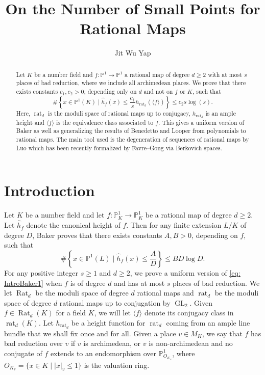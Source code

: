 \documentclass[10pt]{amsart}
\title{On the Number of Small Points for Rational Maps}
\author{Jit Wu Yap}
\newcommand{\bb}{\mathbb}
\newcommand{\h}{\widehat{h}}
\newcommand{\Rat}{\operatorname{Rat}}
\newcommand{\GL}{\operatorname{GL}}
\newcommand{\rat}{\operatorname{rat}}
\numberwithin{theorem}{section}
\numberwithin{example}{section}
\numberwithin{definition}{section}
\begin{document}
\begin{abstract}
Let $K$ be a number field and $f: \bb{P}^1 \to \bb{P}^1$ a rational map of degree $d \geq 2$ with at most $s$ places of bad reduction, where we include all archimedean places. We prove that there exists constants $c_1,c_2 > 0$, depending only on $d$ and not on $f$ or $K$, such that 
$$
\# \left\{ x \in \bb{P}^1(K) \mid \h_f(x) \leq \frac{c_1}{s} h_{\rat_d}(\langle f \rangle) \right\} \leq c_2 s \log(s).
$$
Here, $\rat_d$ is the moduli space of rational maps up to conjugacy, $h_{\rat_d}$ is an ample height and $\langle f \rangle$ is the equivalence class associated to $f$. This gives a uniform version of Baker \cite[Theorem 1.14]{Bak06} as well as generalizing the results of Benedetto \cite{Ben07} and Looper \cite{Loo19} from polynomials to rational maps. The main tool used is the degeneration of sequences of rational maps by Luo \cite{Luo21, Luo22} which has been recently formalized by Favre--Gong \cite{FG24} via Berkovich spaces.
\end{abstract}

\maketitle

\section{Introduction}
Let $K$ be a number field and let $f: \bb{P}_K^1 \to \bb{P}_K^1$ be a rational map of degree $d \geq 2$. Let $\h_f$ denote the canonical height of $f$. Then for any finite extension $L/K$ of degree $D$, Baker \cite{Bak06} proves that there exists constants $A,B > 0$, depending on $f$, such that 
\begin{equation} \label{eq: IntroBaker1}
\# \left\{ x \in \bb{P}^1(L) \mid \h_f(x) \leq  \frac{A}{D} \right\} \leq BD \log D.
\end{equation}
For any positive integer $s \geq 1$ and $d \geq 2$, we prove a uniform version of \eqref{eq: IntroBaker1} when $f$ is of degree $d$ and has at most $s$ places of bad reduction. We let $\Rat_d$ be the moduli space of degree $d$ rational maps and $\rat_d$ be the moduli space of degree $d$ rational maps up to conjugation by $\GL_2$. Given $f \in \Rat_d(K)$ for a field $K$, we will let $\langle f \rangle$ denote its conjugacy class in $\rat_d(K)$. Let $h_{\rat_d}$ be a height function for $\rat_d$ coming from an ample line bundle that we shall fix once and for all. Given a place $v \in M_K$, we say that $f$ has bad reduction over $v$ if $v$ is archimedean, or $v$ is non-archimedean and no conjugate of $f$ extends to an endomorphism over $\bb{P}^1_{O_{K_v}}$, where $O_{K_v} = \{x \in K \mid |x|_v \leq 1\}$ is the valuation ring.
\end{document}
